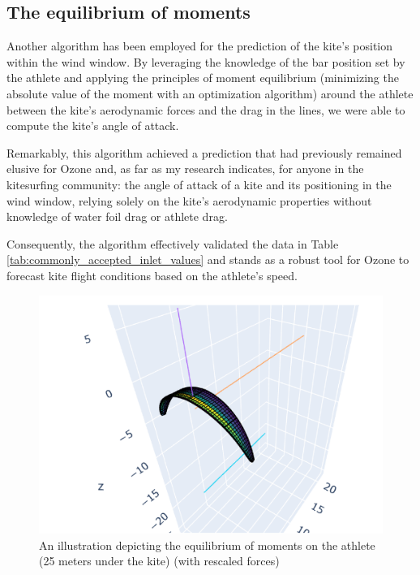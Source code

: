 \subsection{The equilibrium of moments}
\label{sub:Ch2.3.3}

Another algorithm has been employed for the prediction of the kite's position within the wind window. By leveraging the knowledge of the bar position set by the athlete and applying the principles of moment equilibrium (minimizing the absolute value of the moment with an optimization algorithm) around the athlete between the kite's aerodynamic forces and the drag in the lines, we were able to compute the kite's angle of attack.

Remarkably, this algorithm achieved a prediction that had previously remained elusive for Ozone and, as far as my research indicates, for anyone in the kitesurfing community: the angle of attack of a kite and its positioning in the wind window, relying solely on the kite's aerodynamic properties without knowledge of water foil drag or athlete drag.

Consequently, the algorithm effectively validated the data in Table \ref{tab:commonly_accepted_inlet_values} and stands as a robust tool for Ozone to forecast kite flight conditions based on the athlete's speed.

\begin{figure}[H]
    \centering
    \includegraphics[width=1.\linewidth]{figures/Optimization/3D/equilibre moment.png}
    \caption{An illustration depicting the equilibrium of moments on the athlete (25 meters under the kite) (with rescaled forces)}
    \label{fig:An illustration depicting the equilibrium of moments}
\end{figure}

